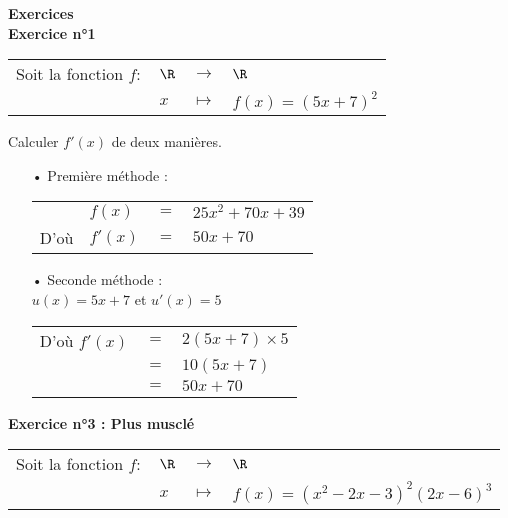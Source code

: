\vspace*{.3cm}

\textbf{Exercices} \\

\textbf{Exercice n°1} \\

\begin{tabular}{llll}
Soit la fonction $f :$ & $\R$ & $\longrightarrow$ & $\R$ \\
& $x$ & $\longmapsto$ & $f(x) = \left(5x + 7\right)^2$ \\
\end{tabular}

\vspace*{.3cm}

Calculer $f'(x)$ de deux manières. \\

\begin{itemize}
\item[•] Première méthode : \\

\begin{tabular}{llll}
& $f(x)$ & $ = $ & $25x^2 + 70x + 39$ \vspace*{.3cm} \\
D'où & $f'(x) $ & $=$ & $ 50x + 70$ \\
\end{tabular}

\vspace*{.3cm}

\item[•] Seconde méthode : \\

$u(x) = 5x + 7$ et $u'(x) = 5$ \\

\begin{tabular}{lll}
D'où $f'(x)$ & $=$ & $2\left(5x + 7\right) \times 5$ \\
& $=$ & $10\left(5x + 7\right) $ \\
& $=$ & $50x + 70$ \\
\end{tabular}
\end{itemize}

\newpage

\textbf{Exercice n°3 : Plus musclé} \\

\begin{tabular}{llll}
Soit la fonction $f :$ & $\R$ & $\longrightarrow$ & $\R$ \\
& $x$ & $\longmapsto$ & $f(x) = \left(x^2 - 2x - 3\right)^2 \left(2x - 6\right)^3$ \\
\end{tabular}

